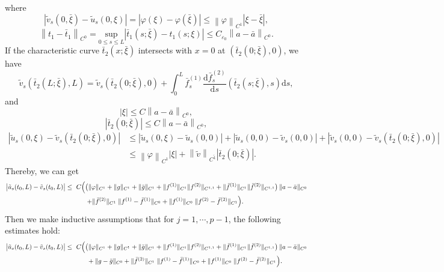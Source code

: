 \documentclass[a4paper,reqno,11pt]{amsart}
\numberwithin{equation}{section} %
\begin{document}
where
$$
\left| \tilde{v}_s(0,\bar{\xi})-\tilde{u}_s(0,\xi ) \right|=\left| \varphi (\xi )-\varphi (\bar{\xi}) \right|\leq \left\| \varphi \right\| _{C^1}\left| \xi -\bar{\xi} \right|,
$$
$$
\left\| t_1-\bar{t}_1 \right\| _{C^0} =\underset{0\le s\le L}{\mathrm{sup}}\left| \bar{t}_1(s;\bar{\xi})-t_1(s;\xi ) \right|\leq C_{\varepsilon _0}\left\| a-\bar{a} \right\| _{C^0}.
$$
If the characteristic curve $\bar{t} _2(x;\bar{\xi}  )$ intersects with $x=0$ at $(\bar{t}_2(0;\bar{\xi} ),0)$, we have
$$
\tilde{v}_s\left( \bar{t}_2\left( L;\bar{\xi} \right) ,L \right) =\tilde{v}_s\left( \bar{t}_2\left( 0;\bar{\xi} \right) ,0 \right) +\int_0^L{\bar{f}_{s}^{(1)}\frac{\mathrm{d}\bar{f}_{s}^{(2)}}{\mathrm{d}s}\left( \bar{t}_2\left( s;\bar{\xi} \right) ,s \right) \mathrm{d}s},
$$
and
$$
	|\xi |\leq C\left\| a-\bar{a} \right\| _{C^0},
$$
$$
	\left| \bar{t}_2(0;\bar{\xi}) \right|\leq C\left\| a-\bar{a} \right\| _{C^0},
$$
$$
\begin{aligned}
	\left| \tilde{u}_s(0,\xi )-\tilde{v}_s\left( \bar{t}_2(0;\bar{\xi}),0 \right) \right|&\leq \left| \tilde{u}_s(0,\xi )-\tilde{u}_s(0,0) \right|+\left| \tilde{u}_s(0,0)-\tilde{v}_s(0,0) \right|+\left| \tilde{v}_s(0,0)-\tilde{v}_s\left( \bar{t}_2(0;\bar{\xi}),0 \right) \right|\\
	&\le \left\| \varphi \right\| _{C^1}\left| \xi \right|+\left\| \tilde{v} \right\| _{C^{\tilde{1}}}\left| \bar{t}_2(0;\bar{\xi}) \right|.
\end{aligned}
$$
Thereby, we can get
$$
\begin{aligned}
\bigl|\tilde u_s(t_0,L)-\tilde v_s(t_0,L)\bigr|
\le{}&\ C\Bigl(
  \bigl(\|\varphi\|_{C^{1}}+\|g\|_{C^{1}}+\|\bar g\|_{C^{1}}
   + \|f^{(1)}\|_{C^{1}}\|f^{(2)}\|_{C^{1,1}}
   + \|\bar f^{(1)}\|_{C^{1}}\|\bar f^{(2)}\|_{C^{1,1}}\bigr)\,
   \|a-\bar a\|_{C^{0}} \Bigr.\\
&\qquad \Bigl.+ \|\bar f^{(2)}\|_{C^{1}}\;\|f^{(1)}-\bar f^{(1)}\|_{C^{0}}
        + \|f^{(1)}\|_{C^{0}}\;\|f^{(2)}-\bar f^{(2)}\|_{C^{1}}
\Bigr).
\end{aligned}
$$
Then we make inductive assumptions that for $j=1,\cdots,p-1$, the following estimates hold:
$$
\begin{aligned}
\bigl|\tilde u_s(t_0,L)-\tilde v_s(t_0,L)\bigr|
\le{}&\ C\Bigl(
  \bigl(\|\varphi\|_{C^{1}}+\|g\|_{C^{1}}+\|\bar g\|_{C^{1}}
  + \|f^{(1)}\|_{C^{1}}\|f^{(2)}\|_{C^{1,1}}
  + \|\bar f^{(1)}\|_{C^{1}}\|\bar f^{(2)}\|_{C^{1,1}}\bigr)\,
  \|a-\bar a\|_{C^{0}} \Bigr.\\
&\qquad + \Bigl. \|g-\bar g\|_{C^{0}}
  + \|\bar f^{(2)}\|_{C^{1}}\;\|f^{(1)}-\bar f^{(1)}\|_{C^{0}}
  + \|f^{(1)}\|_{C^{0}}\;\|f^{(2)}-\bar f^{(2)}\|_{C^{1}}
\Bigr).
\end{aligned}
$$
\end{document}

